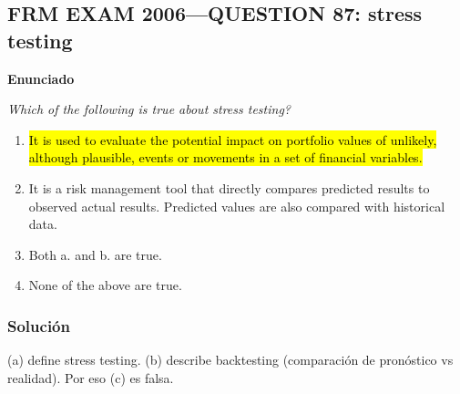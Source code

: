 ﻿\subsection{FRM EXAM 2006---QUESTION 87: stress testing}

\textbf{Enunciado}

\emph{Which of the following is true about stress testing?}
\begin{enumerate}[label=\alph*.]
\item \hl{It is used to evaluate the potential impact on portfolio values of unlikely, although plausible, events or movements in a set of financial variables.}
\item It is a risk management tool that directly compares predicted results to observed actual results. Predicted values are also compared with historical data.
\item Both a. and b. are true.
\item None of the above are true.
\end{enumerate}

\subsubsection*{Solución}


(a) define stress testing. (b) describe backtesting (comparación de pronóstico vs realidad). Por eso (c) es falsa.











